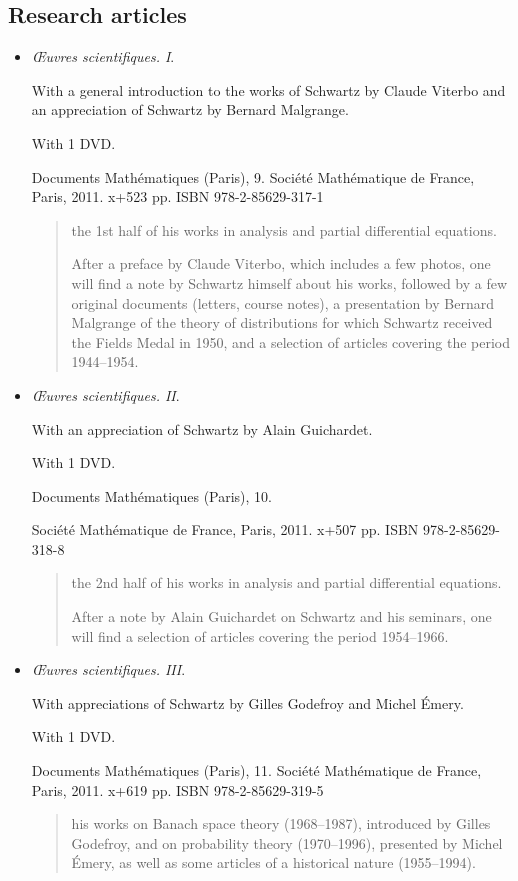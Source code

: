 \documentclass{book}
\numberwithin{equation}{section}
\begin{document}
\subsection{Research articles}
\begin{itemize}
    \item \textit{Œuvres scientifiques. I}.
    
    With a general introduction to the works of Schwartz by Claude Viterbo and an appreciation of Schwartz by Bernard Malgrange.
    
    With 1 DVD.
    
    Documents Mathématiques (Paris), 9. Société Mathématique de France, Paris, 2011. x+523 pp. ISBN 978-2-85629-317-1
    \begin{quotation}
        the 1st half of his works in analysis and partial differential equations.
        
        After a preface by Claude Viterbo, which includes a few photos, one will find a note by Schwartz himself about his works, followed by a few original documents (letters, course notes), a presentation by Bernard Malgrange of the theory of distributions for which Schwartz received the Fields Medal in 1950, and a selection of articles covering the period 1944--1954.
    \end{quotation}
    \item \textit{Œuvres scientifiques. II}.
    
    With an appreciation of Schwartz by Alain Guichardet.
    
    With 1 DVD.
    
    Documents Mathématiques (Paris), 10.
    
    Société Mathématique de France, Paris, 2011. x+507 pp. ISBN 978-2-85629-318-8
    \begin{quotation}
        the 2nd half of his works in analysis and partial differential equations.
        
        After a note by Alain Guichardet on Schwartz and his seminars, one will find a selection of articles covering the period 1954--1966.
    \end{quotation}
    \item \textit{Œuvres scientifiques. III}.
    
    With appreciations of Schwartz by Gilles Godefroy and Michel Émery.
    
    With 1 DVD.
    
    Documents Mathématiques (Paris), 11. Société Mathématique de France, Paris, 2011. x+619 pp. ISBN 978-2-85629-319-5
    \begin{quotation}
        his works on Banach space theory (1968--1987), introduced by Gilles Godefroy, and on probability theory (1970--1996), presented by Michel Émery, as well as some articles of a historical nature (1955--1994).
    \end{quotation}
\end{itemize}
\end{document}
